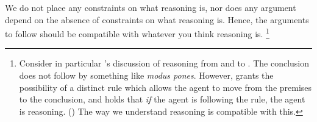 \begin{note}
  We do not place any constraints on what reasoning is, nor does any argument depend on the absence of constraints on what reasoning is.
  Hence, the arguments to follow should be compatible with whatever you think reasoning is.%
  \footnote{
    Consider in particular \citeauthor{Broome:2013aa}'s discussion of reasoning from  and  to .
    The conclusion does not follow by something like \emph{modus pones}.
    However, \citeauthor{Broome:2013aa} grants the possibility of a distinct rule which allows the agent to move from the premises to the conclusion, and holds that \emph{if} the agent is following the rule, the agent is reasoning.
    (\citeyear[233]{Broome:2013aa})
    The way we understand reasoning is compatible with this.
  }%




\end{note}

